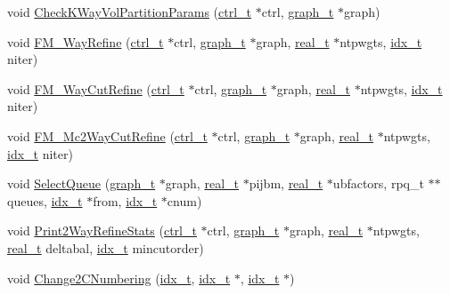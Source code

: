 \begin{DoxyCompactItemize}
\item 
void \hyperlink{a00945_a70f506aae12b862f495f3dec9a8f4fc3}{Check\+K\+Way\+Vol\+Partition\+Params} (\hyperlink{a00742}{ctrl\+\_\+t} $\ast$ctrl, \hyperlink{a00734}{graph\+\_\+t} $\ast$graph)
\item 
void \hyperlink{a00945_a1ffe9ee55eb23e345beb5da3e67c501a}{F\+M\+\_\+Way\+Refine} (\hyperlink{a00742}{ctrl\+\_\+t} $\ast$ctrl, \hyperlink{a00734}{graph\+\_\+t} $\ast$graph, \hyperlink{a00876_a1924a4f6907cc3833213aba1f07fcbe9}{real\+\_\+t} $\ast$ntpwgts, \hyperlink{a00876_aaa5262be3e700770163401acb0150f52}{idx\+\_\+t} niter)
\item 
void \hyperlink{a00945_a1c215aad2804a5cba2e54e93113bc0d5}{F\+M\+\_\+Way\+Cut\+Refine} (\hyperlink{a00742}{ctrl\+\_\+t} $\ast$ctrl, \hyperlink{a00734}{graph\+\_\+t} $\ast$graph, \hyperlink{a00876_a1924a4f6907cc3833213aba1f07fcbe9}{real\+\_\+t} $\ast$ntpwgts, \hyperlink{a00876_aaa5262be3e700770163401acb0150f52}{idx\+\_\+t} niter)
\item 
void \hyperlink{a00945_aaa49d065f964af00512da0c4b3d4cad6}{F\+M\+\_\+\+Mc2\+Way\+Cut\+Refine} (\hyperlink{a00742}{ctrl\+\_\+t} $\ast$ctrl, \hyperlink{a00734}{graph\+\_\+t} $\ast$graph, \hyperlink{a00876_a1924a4f6907cc3833213aba1f07fcbe9}{real\+\_\+t} $\ast$ntpwgts, \hyperlink{a00876_aaa5262be3e700770163401acb0150f52}{idx\+\_\+t} niter)
\item 
void \hyperlink{a00945_a51193f4b76d298d94234642136879390}{Select\+Queue} (\hyperlink{a00734}{graph\+\_\+t} $\ast$graph, \hyperlink{a00876_a1924a4f6907cc3833213aba1f07fcbe9}{real\+\_\+t} $\ast$pijbm, \hyperlink{a00876_a1924a4f6907cc3833213aba1f07fcbe9}{real\+\_\+t} $\ast$ubfactors, rpq\+\_\+t $\ast$$\ast$queues, \hyperlink{a00876_aaa5262be3e700770163401acb0150f52}{idx\+\_\+t} $\ast$from, \hyperlink{a00876_aaa5262be3e700770163401acb0150f52}{idx\+\_\+t} $\ast$cnum)
\item 
void \hyperlink{a00945_a6e4663b4acc63be2c1b33533e7827f1a}{Print2\+Way\+Refine\+Stats} (\hyperlink{a00742}{ctrl\+\_\+t} $\ast$ctrl, \hyperlink{a00734}{graph\+\_\+t} $\ast$graph, \hyperlink{a00876_a1924a4f6907cc3833213aba1f07fcbe9}{real\+\_\+t} $\ast$ntpwgts, \hyperlink{a00876_a1924a4f6907cc3833213aba1f07fcbe9}{real\+\_\+t} deltabal, \hyperlink{a00876_aaa5262be3e700770163401acb0150f52}{idx\+\_\+t} mincutorder)
\item 
void \hyperlink{a00945_a2a470e87111b2ef913b44713920711bb}{Change2\+C\+Numbering} (\hyperlink{a00876_aaa5262be3e700770163401acb0150f52}{idx\+\_\+t}, \hyperlink{a00876_aaa5262be3e700770163401acb0150f52}{idx\+\_\+t} $\ast$, \hyperlink{a00876_aaa5262be3e700770163401acb0150f52}{idx\+\_\+t} $\ast$)
$$
\end{DoxyCompactItemize}
